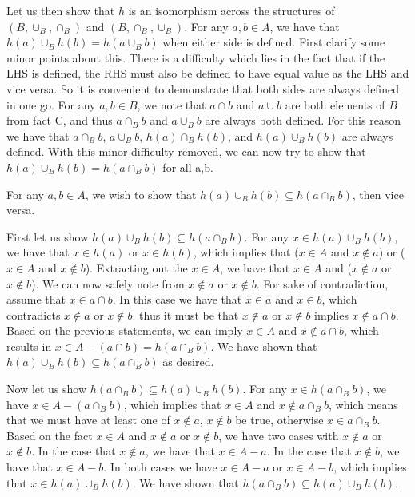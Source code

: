 \documentclass{article}
\begin{document}
\begin{enumerate}
				\medskip
				Let us then show that $h$ is an isomorphism across the structures of $(B, \cup_{B}, \cap_{B})$ and $(B, \cap_{B}, \cup_{B})$. For any $a,b \in A$, we have that $h(a) \cup_{B} h(b) = h(a \cup_{B} b)$ when either side is defined. First clarify some minor points about this. There is a difficulty which lies in the fact that if the LHS is defined, the RHS must also be defined to have equal value as the LHS and vice versa. So it is convenient to demonstrate that both sides are always defined in one go. For any $a,b \in B$, we note that $a \cap b$ and $a \cup b$ are both elements of $B$ from fact C, and thus $a \cap_{B} b$ and $a \cup_{B} b$ are always both defined. For this reason we have that $a \cap_{B} b$, $a \cup_{B} b$, $h(a) \cap_{B} h(b)$, and $h(a) \cup_{B} h(b)$ are always defined. With this minor difficulty removed, we can now try to show that $h(a) \cup_{B} h(b) = h(a \cap_{B} b)$ for all a,b.
				
				\medskip
				For any $a,b \in A$, we wish to show that $h(a) \cup_{B} h(b) \subseteq h(a \cap_{B} b)$, then vice versa. 
				
				\medskip
				First let us show $h(a) \cup_{B} h(b) \subseteq h(a \cap_{B} b)$. For any $x \in h(a) \cup_{B} h(b)$, we have that $x \in h(a)$ or $x \in h(b)$, which implies that ($x \in A$ and $x \notin a$) or ($x \in A$ and $x \notin b$). Extracting out the $x \in A$, we have that $x \in A$ and ($x \notin a$ or $x \notin b$). We can now safely note from $x \notin a$ or $x \notin b$. For sake of contradiction, assume that $x \in a \cap b$. In this case we have that $x \in a$ and $x \in b$, which contradicts $x \notin a$ or $x \notin b$. thus it must be that $x \notin a$ or $x \notin b$ implies $x \notin a \cap b$. Based on the previous statements, we can imply $x \in A$ and $x \notin a \cap b$, which results in $x \in A - (a \cap b) = h(a \cap_{B} b)$. We have shown that $h(a) \cup_{B} h(b) \subseteq h(a \cap_{B} b)$ as desired.
				
				\medskip
				Now let us show $h(a \cap_{B} b) \subseteq h(a) \cup_{B} h(b)$. For any $x \in h(a \cap_{B} b)$, we have $x \in A - (a \cap_{B} b)$, which implies that $x \in A$ and $x \notin a \cap_{B} b$, which means that we must have at least one of $x \notin a$, $x \notin b$ be true, otherwise $x \in a \cap_{B} b$. Based on the fact $x \in A$ and $x \notin a$ or $x \notin b$, we have two cases with $x \notin a$ or $x \notin b$. In the case that $x \notin a$, we have that $x \in A - a$. In the case that $x \notin b$, we have that $x \in A - b$. In both cases we have $x \in A - a$ or $x \in A - b$, which implies that $x \in h(a) \cup_{B} h(b)$. We have shown that $h(a \cap_{B} b) \subseteq h(a) \cup_{B} h(b)$.
				

\end{enumerate}
\end{document}
